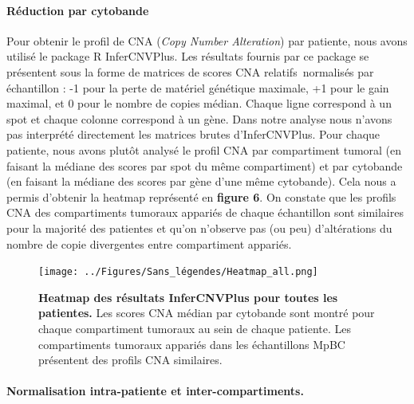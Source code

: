 \documentclass[11pt]{article}
\begin{document}
\paragraph{Réduction par cytobande}

Pour obtenir le profil de CNA (\textit{Copy Number Alteration}) par patiente, nous avons utilisé le package R InferCNVPlus. Les résultats fournis par ce package se présentent sous la forme de matrices de scores CNA relatifs normalisés par échantillon : -1 pour la perte de matériel génétique maximale, +1 pour le gain maximal, et 0 pour le nombre de copies médian. Chaque ligne correspond à un spot et chaque colonne correspond à un gène. Dans notre analyse nous n’avons pas interprété directement les matrices brutes d’InferCNVPlus. Pour chaque patiente, nous avons plutôt analysé le profil CNA par compartiment tumoral (en faisant la médiane des scores par spot du même compartiment) et par cytobande (en faisant la médiane des scores par gène d’une même cytobande). Cela nous a permis d’obtenir la heatmap représenté en \textbf{figure 6}. On constate que les profils CNA des compartiments tumoraux appariés de chaque échantillon sont similaires pour la majorité des patientes et qu’on n’observe pas (ou peu) d’altérations du nombre de copie divergentes entre compartiment appariés.

\begin{figure}[H]
    \centering
    \texttt{[image: ../Figures/Sans\_légendes/Heatmap\_all.png]}
    \caption[\textbf{Figure 6 : Heatmap des résultats InferCNVPlus pour toutes les patientes.}]{\footnotesize \textbf{Heatmap des résultats InferCNVPlus pour toutes les patientes.} Les scores CNA médian par cytobande sont montré pour chaque compartiment tumoraux au sein de chaque patiente. Les compartiments tumoraux appariés dans les échantillons MpBC présentent des profils CNA similaires.}
    \label{fig:fig6}
\end{figure}

\paragraph{Normalisation intra-patiente et inter-compartiments.}
\end{document}
